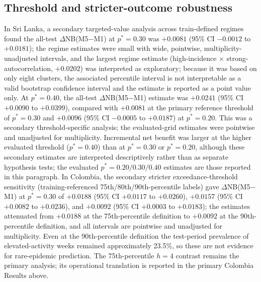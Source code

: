 \documentclass[11pt,a4paper]{article}
\begin{document}
\subsection{Threshold and stricter-outcome robustness}
In Sri Lanka, a secondary targeted-value analysis across train-defined regimes found the all-test $\Delta$NB(M5$-$M1) at $p^*=0.30$ was $+0.0081$ (95\% CI $-0.0012$ to $+0.0181$); the regime estimates were small with wide, pointwise, multiplicity-unadjusted intervals, and the largest regime estimate (high-incidence $\times$ strong-autocorrelation, $+0.0202$) was interpreted as exploratory; because it was based on only eight clusters, the associated percentile interval is not interpretable as a valid bootstrap confidence interval and the estimate is reported as a point value only. At $p^*=0.40$, the all-test $\Delta$NB(M5$-$M1) estimate was $+0.0241$ (95\% CI $+0.0090$ to $+0.0399$), compared with $+0.0081$ at the primary reference threshold of $p^*=0.30$ and $+0.0096$ (95\% CI $-0.0005$ to $+0.0187$) at $p^*=0.20$. This was a secondary threshold-specific analysis; the evaluated-grid estimates were pointwise and unadjusted for multiplicity. Incremental net benefit was larger at the higher evaluated threshold ($p^*=0.40$) than at $p^*=0.30$ or $p^*=0.20$, although these secondary estimates are interpreted descriptively rather than as separate hypothesis tests; the evaluated $p^*=0.20/0.30/0.40$ estimates are those reported in this paragraph. In Colombia, the secondary stricter exceedance-threshold sensitivity (training-referenced 75th/80th/90th-percentile labels) gave $\Delta$NB(M5$-$M1) at $p^*=0.30$ of $+0.0188$ (95\% CI $+0.0117$ to $+0.0260$), $+0.0157$ (95\% CI $+0.0082$ to $+0.0236$), and $+0.0092$ (95\% CI $+0.0003$ to $+0.0183$); the estimates attenuated from $+0.0188$ at the 75th-percentile definition to $+0.0092$ at the 90th-percentile definition, and all intervals are pointwise and unadjusted for multiplicity. Even at the 90th-percentile definition the test-period prevalence of elevated-activity weeks remained approximately 23.5\%, so these are not evidence for rare-epidemic prediction. The 75th-percentile $h=4$ contrast remains the primary analysis; its operational translation is reported in the primary Colombia Results above.
\end{document}
